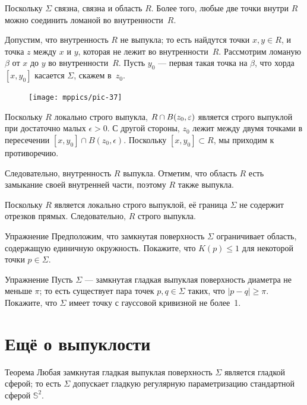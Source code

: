 Поскольку $\Sigma$ связна, связна и область $R$.
Более того, любые две точки внутри $R$ можно соединить ломаной во внутренности~$R$.



Допустим, что внутренность $R$ не выпукла;
то есть найдутся точки $x,y\in R$, и точка $z$ между $x$ и $y$, которая не лежит во внутренности~$R$.
Рассмотрим ломаную $\beta$ от $x$ до $y$ во внутренности~$R$.
Пусть $y_0$ --- первая такая точка на $\beta$, что хорда $[x,y_0]$ касается $\Sigma$, скажем в~$z_0$.

{

\begin{figure}
\vskip-0mm
\centering
\texttt{[image: mppics/pic-37]}
\vskip-0mm
\end{figure}

Поскольку $R$ локально строго выпукла, $R\z\cap B(z_0,\epsilon)$ является строго выпуклой при достаточно малых $\epsilon>0$.
С другой стороны, $z_0$ лежит между двумя точками в пересечении $[x,y_0]\cap B(z_0,\epsilon)$.
Поскольку $[x,y_0]\subset R$, мы приходим к противоречию.

}

Следовательно, внутренность $R$ выпукла.
Отметим, что область $R$ есть замыкание своей внутренней части, поэтому $R$ также выпукла.

Поскольку $R$ является локально строго выпуклой, её граница $\Sigma$ не содержит отрезков прямых.
Следовательно, $R$  строго выпукла.
\qeds

\begin{thm}{Упражнение}\label{ex:surrounds-disc}
Предположим, что замкнутая поверхность $\Sigma$ ограничивает область, содержащую единичную окружность.
Покажите, что $K(p)\le 1$ для некоторой точки $p \in \Sigma$. 
\end{thm}

\begin{thm}{Упражнение}\label{ex:small-gauss}
Пусть $\Sigma$ --- замкнутая гладкая выпуклая поверхность диаметра не меньше $\pi$;
то есть существует пара точек $p,q\in\Sigma$ таких, что $|p-q|\ge \pi$.
Покажите, что $\Sigma$ имеет точку с гауссовой кривизной не более~1.
\end{thm}

\section{Ещё о выпуклости}

\begin{thm}{Теорема}\label{thm:convex-closed}
Любая замкнутая гладкая выпуклая поверхность $\Sigma$ является гладкой сферой;
то есть $\Sigma$ допускает гладкую регулярную параметризацию стандартной сферой $\mathbb{S}^2$.
\end{thm}

